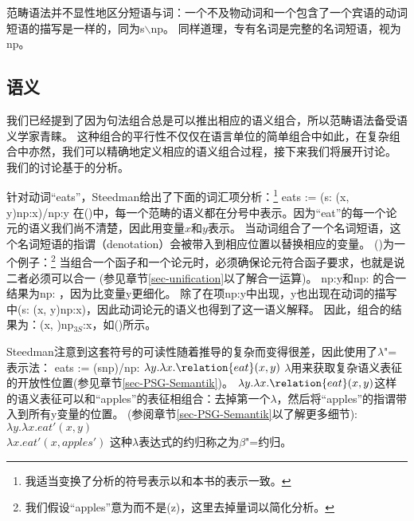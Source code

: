 \noindent
范畴语法并不显性地区分短语与词：一个不及物动词和一个包含了一个宾语的动词短语的描写是一样的，同为s$\backslash$np。
同样道理，专有名词是完整的名词短语，视为np。\is{$\backslash$|)}

\subsection{语义}

我们已经提到了因为句法组合总是可以推出相应的语义组合，所以范畴语法备受语义学家青睐。
这种组合的平行性不仅仅在语言单位的简单组合中如此，在复杂组合中亦然，我们可以精确地定义相应的语义组合过程，接下来我们将展开讨论。
我们的讨论基于\citet[Section~2.1.2]{Steedman97a}的分析。

针对动词``eats''，Steedman给出了下面的词汇项分析：\footnote{
 我适当变换了分析的符号表示以和本书的表示一致。
}
\ea
eats := (s: (x, y)\bs np:x)/np:y
\z
在()中，每一个范畴的语义都在分号中表示。因为``eat''的每一个论元的语义我们尚不清楚，因此用变量$x$和$y$表示。
当动词组合了一个名词短语，这个名词短语的指谓（denotation）会被带入到相应位置以替换相应的变量。
()为一个例子：\footnote{
  我们假设``apples''意为而不是(z)，这里去掉量词以简化分析。
}
\ea
{}
\z
当组合一个函子和一个论元时，必须确保论元符合函子要求，也就是说二者必须可以合一 (参见章节\ref{sec-unification}以了解合一运算)。
np:y和np: 的合一结果为np: ，因为比变量y更细化。
除了在项np:y中出现，y也出现在动词的描写中(s: (x, y)\bs np:x)，因此动词论元的语义也得到了这一语义解释。
因此，组合的结果为：(x, )\bs np$_{3S}$:x，如()所示。

Steedman注意到这套符号的可读性随着推导的复杂而变得很差，因此使用了$\lambda$"=表示法：
\ea
eats := (s\bs np)/np: $\lambda y.\lambda x.\relation{eat}(x, y)$
\z
$\lambda$用来获取复杂语义表征的开放性位置(参见章节\ref{sec-PSG-Semantik})。
$\lambda y.\lambda x.\relation{eat}(x, y)$这样的语义表征可以和``{apples}''的表征相组合：去掉第一个$\lambda$，然后将``apples''的指谓带入到所有y变量的位置。
(参阅章节\ref{sec-PSG-Semantik}以了解更多细节):
\ea
$\lambda y.\lambda x.eat'(x, y)$ \\
$\lambda x.eat'(x, apples')$
\z
这种$\lambda$表达式的约归称之为$\beta$"=约归\label{Seite-beta-Reduktion}。

